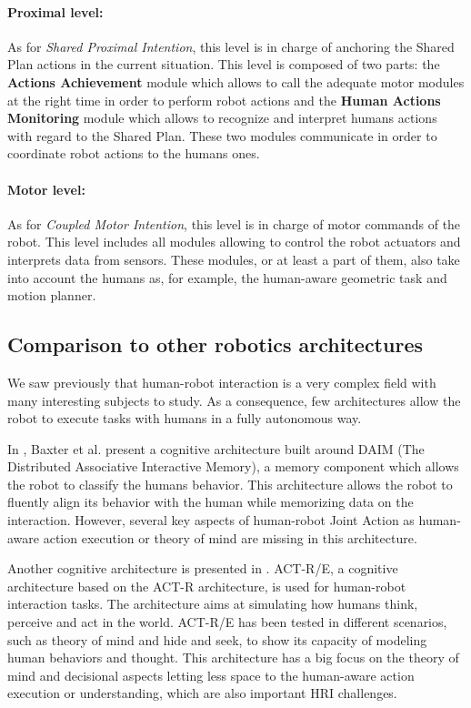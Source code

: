 \documentclass[english,a4paper,11pt,twoside]{StyleThese}
\begin{document}
\paragraph{Proximal level:}
As for \textit{Shared Proximal Intention}, this level is in charge of anchoring the Shared Plan actions in the current situation. This level is composed of two parts: the \textbf{Actions Achievement} module which allows to call the adequate motor modules at the right time in order to perform robot actions and the \textbf{Human Actions Monitoring} module which allows to recognize and interpret humans actions with regard to the Shared Plan. These two modules communicate in order to coordinate robot actions to the humans ones.

\paragraph{Motor level:}
As for \textit{Coupled Motor Intention}, this level is in charge of motor commands of the robot. This level includes all modules allowing to control the robot actuators and interprets data from sensors. These modules, or at least a part of them, also take into account the humans as, for example, the human-aware geometric task and motion planner.

\subsection{Comparison to other robotics architectures}

We saw previously that human-robot interaction is a very complex field with many interesting subjects to study. As a consequence, few architectures allow the robot to execute tasks with humans in a fully autonomous way. 

In \cite{baxter2013cognitive}, Baxter et al. present a cognitive architecture built around DAIM (The Distributed Associative Interactive Memory), a memory component which allows the robot to classify the humans behavior. This architecture allows the robot to fluently align its behavior with the human while memorizing data on the interaction. However, several key aspects of human-robot Joint Action as human-aware action execution or theory of mind are missing in this architecture. 

Another cognitive architecture is presented in \cite{trafton2013act}. ACT-R/E, a cognitive architecture based on the ACT-R architecture, is used for human-robot interaction tasks. The architecture aims at simulating how humans think, perceive and act in the world. ACT-R/E has been tested in different scenarios, such as theory of mind and hide and seek, to show its capacity of modeling human behaviors and thought. This architecture has a big focus on the theory of mind and decisional aspects letting less space to the human-aware action execution or understanding, which are also important HRI challenges. 
\end{document}
